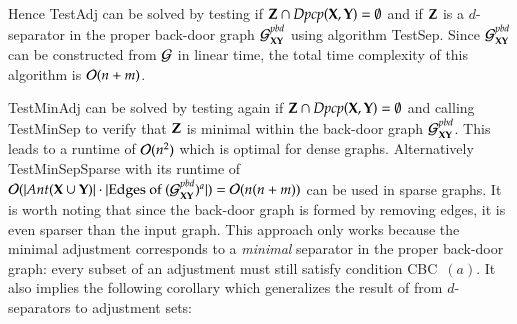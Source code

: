 \begin{table*}
\caption{Definitions of algorithmic tasks related to adjustment in DAGs. 
The meaning of parameters $\bX, \bY, \bZ, \bI,$ and $\bR$ is the same as in 
the definitions of tasks related to $m$-separation in  Table~\ref{fig:problems}.
The right column shows the associated time complexities given in this section.
Due to our linear-time reduction from causal effect identification by adjustment to $m$-separation 
in a subgraph of an input DAG, the time complexities to solve the problems above are the
same as in Table~\ref{fig:problems}.
}
\label{fig:problemsadj}
 
\end{table*}



\newcommand{\forbiddenNodes}{De_{\overline{\bX}}(\{W \in \bV \mid  \exists \text{proper path } \bX \stackrel{+}{\to} W \stackrel{*}{\to} \bY \})}
\newcommand{\forbiddenEdges}{\{X \to D \mid  X \in \bX, D \in \cD \}}

Hence {\sc TestAdj} can be solved by testing if ${\bf Z}\cap \textit{Dpcp}({\bf X},{\bf Y}) = \emptyset$
and if ${\bf Z}$ is a $d$-separator in the proper back-door graph ${\cal G}^{pbd}_{{\bf X}{\bf Y}}$ using algorithm {\sc TestSep}.
Since ${\cal G}^{pbd}_{{\bf X}{\bf Y}}$ can be constructed from ${\cal G}$ in linear time, the total 
time complexity of this algorithm is ${\cal O}(n+m)$.


{\sc TestMinAdj} can be solved by testing again if ${\bf Z}\cap \textit{Dpcp}({\bf X},{\bf Y}) = \emptyset$ and calling {\sc TestMinSep} to verify that $ {\bf Z} $ is minimal within the back-door graph $ {\cal G}^{pbd}_{{\bf X}{\bf Y}} $. This leads to a runtime of $ {\cal O}(n^2) $ which is optimal for dense graphs. Alternatively {\sc TestMinSepSparse} with its runtime of ${\cal O}(|\textit{Ant}({\bf X} \cup {\bf Y})| \cdot  |\text{Edges of } ({\cal G}^{pbd}_{{\bf X}{\bf Y}})^a | ) = {\cal O}(n(n+m)) $ can be used in sparse graphs. It is worth noting that since the back-door graph is formed by removing edges, it is even sparser than the input graph. 
This approach only works because the minimal adjustment corresponds to a \emph{minimal} separator in the proper back-door graph: every subset of an adjustment must still satisfy condition CBC~$(a)$. It also implies the following corollary which generalizes the result of \citet{TianPP1998} from $d$-separators to adjustment sets:

